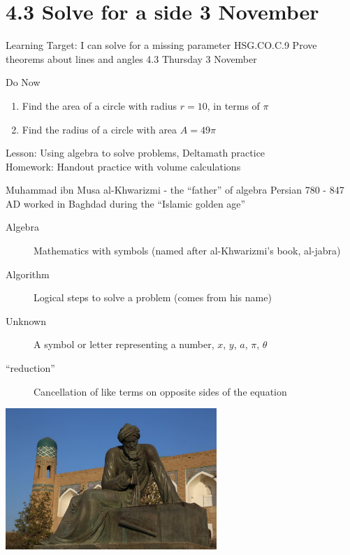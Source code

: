 \section{4.3 Solve for a side \hfill 3 November \,}
  \begin{frame}{Learning Target: I can solve for a missing parameter}
    {HSG.CO.C.9 Prove theorems about lines and angles  \hfill \alert{4.3 Thursday 3 November}}
    \begin{block}{Do Now}
      \begin{enumerate}
        \item Find the area of a circle with radius $r=10$, in terms of $\pi$
        \item Find the radius of a circle with area $A=49 \pi$
      \end{enumerate}
    \end{block}
      Lesson: Using algebra to solve problems, Deltamath practice \\
      Homework: Handout practice with volume calculations
  \end{frame}

\begin{frame}{Muhammad ibn Musa al-Khwarizmi - the ``father'' of algebra}
  {Persian 780 - 847 AD worked in Baghdad during the ``Islamic golden age''}
  \begin{description}
    \item[Algebra] Mathematics with symbols (named after al-Khwarizmi's book, al-jabra)
    \item[Algorithm] Logical steps to solve a problem (comes from his name)
    \item[Unknown] A symbol or letter representing a number, $x$, $y$, $a$, $\pi$, $\theta$
    \item[``reduction''] Cancellation of like terms on opposite sides of the equation
  \end{description}
    \center
    \includegraphics[width=0.6\textwidth]{../graphics/al-Khwarizmi_960-640.jpg}
\end{frame}


